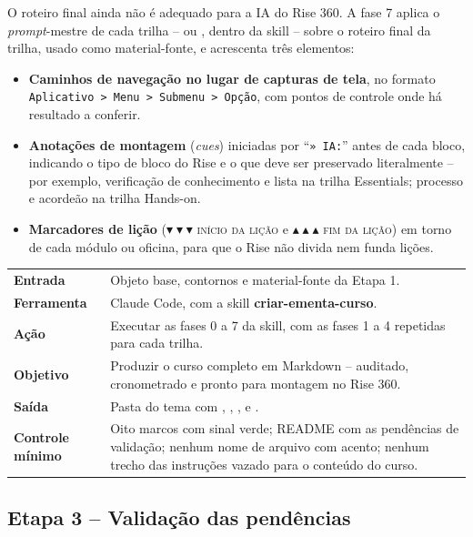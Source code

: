 \documentclass[12pt,a4paper]{article}
\makeatletter
\newcommand{\campo}[1]{\textcolor{azulinst}{\textbf{#1}}}
\newcommand{\skill}[1]{\textsf{\textbf{#1}}}
\newcommand{\iniciolicao}{\ensuremath{\blacktriangledown\blacktriangledown\blacktriangledown}}
\newcommand{\fimlicao}{\ensuremath{\blacktriangle\blacktriangle\blacktriangle}}
\newenvironment{ficha}
  {\begin{longtable}{@{}L{0.24\textwidth}L{0.72\textwidth}@{}}\toprule}
  {\bottomrule\end{longtable}}
\makeatother
\begin{document}
O roteiro final ainda não é adequado para a IA do Rise 360. A fase 7 aplica o \textit{prompt}-mestre de cada trilha --  ou , dentro da skill -- sobre o roteiro final da trilha, usado como material-fonte, e acrescenta três elementos:

\begin{itemize}[leftmargin=*]
\item \textbf{Caminhos de navegação no lugar de capturas de tela}, no formato \texttt{Aplicativo > Menu > Submenu > Opção}, com pontos de controle onde há resultado a conferir.
\item \textbf{Anotações de montagem} (\textit{cues}) iniciadas por ``\texttt{» IA:}'' antes de cada bloco, indicando o tipo de bloco do Rise e o que deve ser preservado literalmente -- por exemplo, verificação de conhecimento e lista na trilha Essentials; processo e acordeão na trilha Hands-on.
\item \textbf{Marcadores de lição} (\iniciolicao{} \textsc{início da lição} e \fimlicao{} \textsc{fim da lição}) em torno de cada módulo ou oficina, para que o Rise não divida nem funda lições.
\end{itemize}

\begin{ficha}
\campo{Entrada} & Objeto base, contornos e material-fonte da Etapa 1. \\ \addlinespace
\campo{Ferramenta} & Claude Code, com a skill \skill{criar-ementa-curso}. \\ \addlinespace
\campo{Ação} & Executar as fases 0 a 7 da skill, com as fases 1 a 4 repetidas para cada trilha. \\ \addlinespace
\campo{Objetivo} & Produzir o curso completo em Markdown -- auditado, cronometrado e pronto para montagem no Rise 360. \\ \addlinespace
\campo{Saída} & Pasta do tema com , , ,  e . \\ \addlinespace
\campo{Controle mínimo} & Oito marcos com sinal verde; README com as pendências de validação; nenhum nome de arquivo com acento; nenhum trecho das instruções vazado para o conteúdo do curso. \\
\end{ficha}

\subsection{Etapa 3 -- Validação das pendências}
\end{document}

